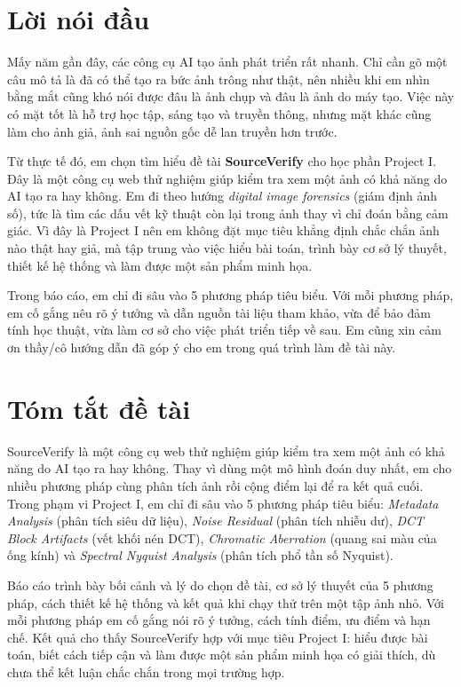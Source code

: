\documentclass[14pt,a4paper,oneside]{report}
\begin{document}
\clearpage

\chapter*{Lời nói đầu}
Mấy năm gần đây, các công cụ AI tạo ảnh phát triển rất nhanh. Chỉ cần gõ một câu mô tả là đã có thể tạo ra bức ảnh trông như thật, nên nhiều khi em nhìn bằng mắt cũng khó nói được đâu là ảnh chụp và đâu là ảnh do máy tạo. Việc này có mặt tốt là hỗ trợ học tập, sáng tạo và truyền thông, nhưng mặt khác cũng làm cho ảnh giả, ảnh sai nguồn gốc dễ lan truyền hơn trước.

Từ thực tế đó, em chọn tìm hiểu đề tài \textbf{SourceVerify} cho học phần Project I. Đây là một công cụ web thử nghiệm giúp kiểm tra xem một ảnh có khả năng do AI tạo ra hay không. Em đi theo hướng \textit{digital image forensics} (giám định ảnh số), tức là tìm các dấu vết kỹ thuật còn lại trong ảnh thay vì chỉ đoán bằng cảm giác. Vì đây là Project I nên em không đặt mục tiêu khẳng định chắc chắn ảnh nào thật hay giả, mà tập trung vào việc hiểu bài toán, trình bày cơ sở lý thuyết, thiết kế hệ thống và làm được một sản phẩm minh họa.

Trong báo cáo, em chỉ đi sâu vào 5 phương pháp tiêu biểu. Với mỗi phương pháp, em cố gắng nêu rõ ý tưởng và dẫn nguồn tài liệu tham khảo, vừa để bảo đảm tính học thuật, vừa làm cơ sở cho việc phát triển tiếp về sau. Em cũng xin cảm ơn thầy/cô hướng dẫn đã góp ý cho em trong quá trình làm đề tài này.

\clearpage

\chapter*{Tóm tắt đề tài}
SourceVerify là một công cụ web thử nghiệm giúp kiểm tra xem một ảnh có khả năng do AI tạo ra hay không. Thay vì dùng một mô hình đoán duy nhất, em cho nhiều phương pháp cùng phân tích ảnh rồi cộng điểm lại để ra kết quả cuối. Trong phạm vi Project I, em chỉ đi sâu vào 5 phương pháp tiêu biểu: \textit{Metadata Analysis} (phân tích siêu dữ liệu), \textit{Noise Residual} (phân tích nhiễu dư), \textit{DCT Block Artifacts} (vết khối nén DCT), \textit{Chromatic Aberration} (quang sai màu của ống kính) và \textit{Spectral Nyquist Analysis} (phân tích phổ tần số Nyquist).

Báo cáo trình bày bối cảnh và lý do chọn đề tài, cơ sở lý thuyết của 5 phương pháp, cách thiết kế hệ thống và kết quả khi chạy thử trên một tập ảnh nhỏ. Với mỗi phương pháp em cố gắng nói rõ ý tưởng, cách tính điểm, ưu điểm và hạn chế. Kết quả cho thấy SourceVerify hợp với mục tiêu Project I: hiểu được bài toán, biết cách tiếp cận và làm được một sản phẩm minh họa có giải thích, dù chưa thể kết luận chắc chắn trong mọi trường hợp.
\end{document}
